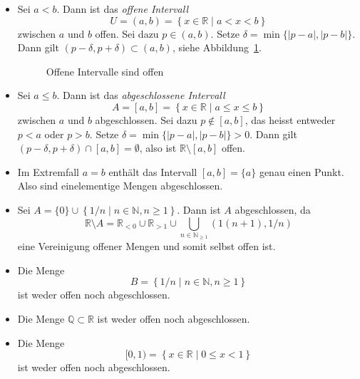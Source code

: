 \documentclass[../main.tex]{subfiles}
\begin{document}
\begin{examples}
  \leavevmode
  \begin{itemize}
    \item Sei
      $a < b$. Dann ist
      das \emph{offene Intervall}
      \[
        U = (a, b) = \left\{x \in \mathbb{R} \mid a < x < b\right\}
      \]
      zwischen $a$ und $b$ offen. Sei dazu $p \in (a, b)$. Setze
      $\delta = \min \{|p - a|, |p - b|\}$.
      Dann gilt
      $(p - \delta, p + \delta) \subset (a, b)$,
      siehe Abbildung~\ref{fig:offen}.
      \begin{figure}[htb]
        \centering
        
        \caption{Offene Intervalle
        sind offen}%
        \label{fig:offen}
      \end{figure}
      
    \item Sei $a \leq b$. Dann ist das \emph{abgeschlossene Intervall}
      \[
        A = [a, b] = \left\{x \in \mathbb{R} \mid a \leq x \leq b\right\}
      \]
      zwischen $a$ und $b$ abgeschlossen.
      Sei dazu $p \notin [a,b]$, das heisst entweder
      $p < a$ oder $p > b$.
      Setze $\delta = \min \{|p- a|, |p-b|\} > 0$.
      Dann gilt
      $(p - \delta, p + \delta) \cap [a, b] = \emptyset$,
      also ist $\mathbb{R} \setminus [a, b]$ offen.
    \item Im Extremfall $a = b$ enthält das Intervall
      $[a,b] = \{a\}$ genau einen Punkt. Also
      sind einelementige Mengen abgeschlossen.
    \item Sei $A = \{0\} \cup \left\{1/n \mid n \in 
      \mathbb{N}, n \geq 1\right\}$.
      Dann ist $A$ abgeschlossen, da
      \[
        \mathbb{R} \setminus A = \mathbb{R}_{<0} \cup
        \mathbb{R}_{>1} \cup \bigcup_{n \in \mathbb{N}_{\geq 1}}
        \left(1(n+1), 1/n\right)
      \]
      eine Vereinigung offener Mengen und somit selbst offen ist.
    \item Die Menge
      \[
        B = \left\{1/n \mid n \in \mathbb{N}, n \geq 1\right\}
      \]
      ist weder offen noch abgeschlossen.
    \item Die Menge $\mathbb{Q} \subset \mathbb{R}$ 
      ist weder offen noch abgeschlossen.
    \item Die Menge
      \[
        [0, 1) = \left\{x \in \mathbb{R} \mid 0 \leq%
        x < 1\right\}
      \]
      ist weder offen noch abgeschlossen.
  \end{itemize}
\end{examples}
\end{document}
